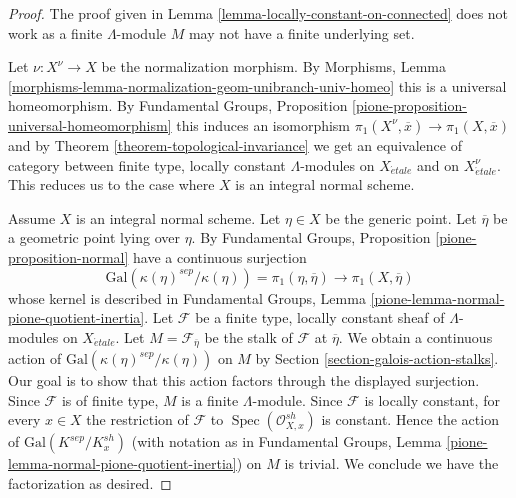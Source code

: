 \documentclass[10pt,a4paper]{amsart}
\theoremstyle{plain}
\theoremstyle{definition}
\theoremstyle{remark}
\numberwithin{equation}{subsection}
\def\Spec{\mathop{\mathrm{Spec}}}
\def\etale{{\acute{e}tale}}
\begin{document}
\begin{proof}
The proof given in Lemma \ref{lemma-locally-constant-on-connected}
does not work as a finite $\Lambda$-module $M$ may not have a finite
underlying set.

\medskip\noindent
Let $\nu : X^\nu \to X$ be the normalization morphism. By Morphisms, Lemma
\ref{morphisms-lemma-normalization-geom-unibranch-univ-homeo}
this is a universal homeomorphism. By
Fundamental Groups, Proposition \ref{pione-proposition-universal-homeomorphism}
this induces an isomorphism
$\pi_1(X^\nu, \overline{x}) \to \pi_1(X, \overline{x})$
and by Theorem \ref{theorem-topological-invariance} we get
an equivalence of category between finite type, locally constant
$\Lambda$-modules on $X_\etale$ and on $X^\nu_\etale$.
This reduces us to the case where $X$ is an integral normal scheme.

\medskip\noindent
Assume $X$ is an integral normal scheme. Let $\eta \in X$ be the generic point.
Let $\overline{\eta}$ be a geometric point lying over $\eta$.
By Fundamental Groups, Proposition \ref{pione-proposition-normal}
have a continuous surjection
$$
\text{Gal}(\kappa(\eta)^{sep}/\kappa(\eta)) = \pi_1(\eta, \overline{\eta})
\longrightarrow
\pi_1(X, \overline{\eta})
$$
whose kernel is described in Fundamental Groups, Lemma
\ref{pione-lemma-normal-pione-quotient-inertia}.
Let $\mathcal{F}$ be a finite type, locally constant sheaf of $\Lambda$-modules
on $X_\etale$. Let $M = \mathcal{F}_{\overline{\eta}}$
be the stalk of $\mathcal{F}$ at $\overline{\eta}$.
We obtain a continuous action of $\text{Gal}(\kappa(\eta)^{sep}/\kappa(\eta))$
on $M$ by Section \ref{section-galois-action-stalks}.
Our goal is to show that this action factors through the
displayed surjection.
Since $\mathcal{F}$ is of finite type, $M$ is a finite $\Lambda$-module.
Since $\mathcal{F}$ is locally constant, for every $x \in X$
the restriction of $\mathcal{F}$ to $\Spec(\mathcal{O}_{X, x}^{sh})$
is constant. Hence the action of $\text{Gal}(K^{sep}/K_x^{sh})$
(with notation as in Fundamental Groups, Lemma
\ref{pione-lemma-normal-pione-quotient-inertia})
on $M$ is trivial. We conclude we have the factorization as desired.


\end{proof}
\end{document}
